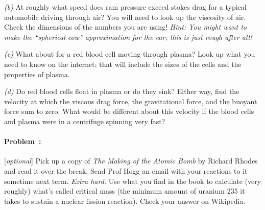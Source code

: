 \documentclass[12pt]{article}
\newcounter{problem}
\begin{document}
\textsl{(b)} At roughly what speed does ram pressure exceed stokes
drag for a typical automobile driving through air?  You will need to
look up the viscosity of air.  Check the dimensions of the numbers you
are using!  \emph{Hint: You might want to make the ``spherical cow''
  approximation for the car; this is just rough after all!}

\textsl{(c)} What about for a red blood cell moving through plasma?
Look up what you need to know on the internet; that will include the
sizes of the cells and the properties of plasma.

\textsl{(d)} Do red blood cells float in plasma or do they sink?
Either way, find the velocity at which the viscous drag force, the
gravitational force, and the buoyant force sum to zero.  What would
be different about this velocity if the blood cells and plasma were in
a centrifuge spinning very fast?

\paragraph{Problem~\theproblem:}%
[\textsl{optional}] Pick up a copy of \textit{The Making of the Atomic
  Bomb} by Richard Rhodes and read it over the break.  Send Prof Hogg
an email with your reactions to it sometime next term.  \emph{Extra
  hard:} Use what you find in the book to calculate (very roughly) what's called
critical mass (the minimum amount of uranium 235 it takes to sustain a
nuclear fission reaction).  Check your answer on Wikipedia.
\end{document}
